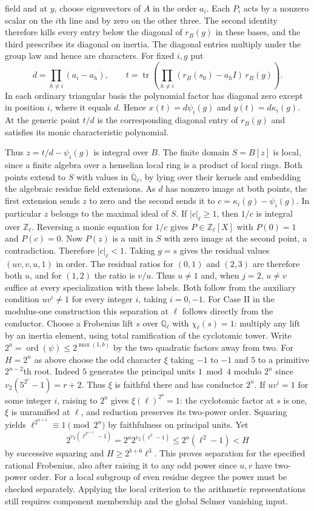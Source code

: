 \documentclass[11pt]{amsart}
\theoremstyle{definition}
\theoremstyle{remark}
\begin{document}
field and at $y$, choose eigenvectors of $A$ in the order $a_i$.
Each $P_i$ acts by a nonzero scalar on the $i$th line and by zero
on the other three. The second identity therefore kills every
entry below the diagonal of $r_B(g)$ in these bases, and the third
prescribes its diagonal on inertia. The diagonal entries multiply
under the group law and hence are characters. For fixed $i,g$ put
\[
 d=\prod_{h\ne i}(a_i-a_h),\qquad
 t=\operatorname{tr}\!\left(\prod_{h\ne i}(r_B(s_0)-a_h I)\,r_B(g)\right).
\]
In each ordinary triangular basis the polynomial factor has diagonal
zero except in position $i$, where it equals $d$. Hence
$x(t)=d\psi_i(g)$ and $y(t)=d\kappa_i(g)$. At the generic point
$t/d$ is the corresponding diagonal entry of $r_B(g)$ and satisfies
its monic characteristic polynomial.

Thus $z=t/d-\psi_i(g)$ is integral over $B$. The finite domain
$S=B[z]$ is local, since a finite algebra over a henselian local
ring is a product of local rings. Both points extend to $S$ with
values in $\overline{\mathbb Q}_\ell$, by lying over their kernels
and embedding the algebraic residue field extensions. As $d$ has
nonzero image at both points, the first extension sends $z$ to zero
and the second sends it to $c=\kappa_i(g)-\psi_i(g)$. In particular
$z$ belongs to the maximal ideal of $S$. If $|c|_\ell\ge1$, then
$1/c$ is integral over $\mathbb Z_\ell$. Reversing a monic equation
for $1/c$ gives $P\in\mathbb Z_\ell[X]$ with $P(0)=1$ and $P(c)=0$.
Now $P(z)$ is a unit in $S$ with zero image at the second point,
a contradiction. Therefore $|c|_\ell<1$. Taking $g=s$ gives the
residual values $(uv,v,u,1)$ in order.
The residual ratios for $(0,1)$ and $(2,3)$ are therefore both
$u$, and for $(1,2)$ the ratio is $v/u$. Thus $u\ne1$ and,
when $j=2$, $u\ne v$ suffice at every specialization with these
labels. Both follow from the auxiliary condition
$uv^i\ne1$ for every integer $i$, taking $i=0,-1$. For Case II in the modulus-one construction this separation at
$\ell$ follows directly from the conductor. Choose a Frobenius lift
$s$ over $\mathbb Q_\ell$ with $\chi_\ell(s)=1$: multiply any lift
by an inertia element, using total ramification of the cyclotomic tower.
Write $2^a=\operatorname{ord}(\psi)\le 2^{\max(1,b)}$ by the two
quadratic factors away from two. For $H=2^n$ as above choose the odd
character $\xi$ taking $-1$ to $-1$ and $5$ to a primitive
$2^{n-2}$th root. Indeed $5$ generates the principal units
$1\bmod4$ modulo $2^n$ since $v_2(5^{2^r}-1)=r+2$.
Thus $\xi$ is faithful there and has conductor $2^n$.
If $uv^i=1$ for some integer $i$, raising to $2^a$ gives
$\xi(\ell)^{2^a}=1$: the cyclotomic factor at $s$ is one,
$\xi$ is unramified at $\ell$, and reduction preserves its
two-power order. Squaring yields $\ell^{2^{a+1}}\equiv1\pmod{2^n}$
by faithfulness on principal units. Yet
\[
 2^{v_2(\ell^{2^{a+1}}-1)}
 =2^a 2^{v_2(\ell^2-1)}\le 2^a(\ell^2-1)<H
\]
by successive squaring and $H\ge2^{b+6}\ell^3$.
This proves separation for the specified rational Frobenius, also
after raising it to any odd power since $u,v$ have two-power order.
For a local subgroup of even residue degree the power must be checked
separately. Applying the local criterion to the arithmetic
representations still requires component membership and the global
Selmer vanishing input.
\end{document}
